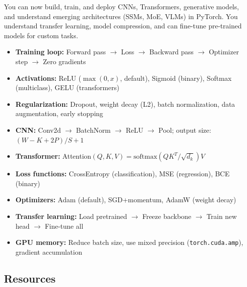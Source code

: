 \documentclass[11pt, a4paper, oneside]{report}
\begin{document}
\begin{microcheckpoint}
You can now build, train, and deploy CNNs, Transformers, generative models, and understand emerging architectures (SSMs, MoE, VLMs) in PyTorch. You understand transfer learning, model compression, and can fine-tune pre-trained models for custom tasks.
\end{microcheckpoint}

\begin{cheatsheetbox}
\begin{itemize}[leftmargin=*]
\item \textbf{Training loop:} Forward pass $\to$ Loss $\to$ Backward pass $\to$ Optimizer step $\to$ Zero gradients
\item \textbf{Activations:} ReLU ($\max(0,x)$, default), Sigmoid (binary), Softmax (multiclass), GELU (transformers)
\item \textbf{Regularization:} Dropout, weight decay (L2), batch normalization, data augmentation, early stopping
\item \textbf{CNN:} Conv2d $\to$ BatchNorm $\to$ ReLU $\to$ Pool; output size: $(W - K + 2P)/S + 1$
\item \textbf{Transformer:} Attention$(Q,K,V) = \text{softmax}(QK^T/\sqrt{d_k})V$
\item \textbf{Loss functions:} CrossEntropy (classification), MSE (regression), BCE (binary)
\item \textbf{Optimizers:} Adam (default), SGD+momentum, AdamW (weight decay)
\item \textbf{Transfer learning:} Load pretrained $\to$ Freeze backbone $\to$ Train new head $\to$ Fine-tune all
\item \textbf{GPU memory:} Reduce batch size, use mixed precision (\texttt{torch.cuda.amp}), gradient accumulation
\end{itemize}
\end{cheatsheetbox}


\subsection*{Resources}
\end{document}
